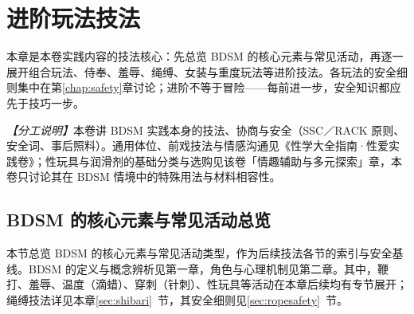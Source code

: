 \documentclass[12pt,UTF8]{ctexbook}
\begin{document}
\chapter{进阶玩法技法}

本章是本卷实践内容的技法核心：先总览 BDSM 的核心元素与常见活动，再逐一展开组合玩法、侍奉、羞辱、绳缚、女装与重度玩法等进阶技法。各玩法的安全细则集中在第\ref{chap:safety}章讨论；进阶不等于冒险——每前进一步，安全知识都应先于技巧一步。

\noindent\textit{【分工说明】}本卷讲 BDSM 实践本身的技法、协商与安全（SSC／RACK 原则、安全词、事后照料）。通用体位、前戏技法与情感沟通见《性学大全指南·性爱实践卷》；性玩具与润滑剂的基础分类与选购见该卷「情趣辅助与多元探索」章，本卷只讨论其在 BDSM 情境中的特殊用法与材料相容性。


\section{BDSM 的核心元素与常见活动总览}

本节总览 BDSM 的核心元素与常见活动类型，作为后续技法各节的索引与安全基线。BDSM 的定义与概念辨析见第一章，角色与心理机制见第二章。其中，鞭打、羞辱、温度（滴蜡）、穿刺（针刺）、性玩具等活动在本章后续均有专节展开；绳缚技法详见本章\ref{sec:shibari}~节，其安全细则见\ref{sec:ropesafety}~节。
\end{document}
